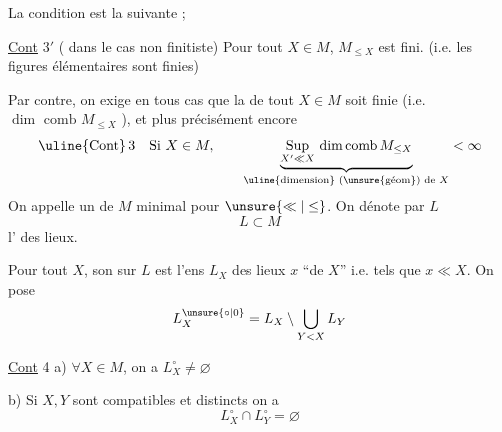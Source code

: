  La condition est la suivante ; 

\uline{Cont} $3'$ ( dans le cas non finitiste) \deleted{$\forall$} Pour tout $X\in M$,   $M_{\leq X}$ est fini. (i.e. les figures élémentaires sont finies)

Par contre, on exige en tous cas que la  de tout  $X\in M$ soit finie (i.e. $\dim\text{ comb }M_{\leq X}$ ), et plus  précisément encore
\[
\uline{\text{Cont}}\,3 \quad \text{Si } X\in M,\qquad
\underbrace{\mathop{\mathrm{Sup}}\limits_{X'\ll X}\,\mathrm{dim\,comb}\,M_{\leq X}}_{\text{\uline{dimension} (\unsure{géom}) de }X}<\infty
\]
On appelle  un  de $M$ minimal pour $\unsure{\ll|\leq}$. On dénote par $L$
\[
L\subset M
\]
l' des lieux.

Pour tout $X$, son   sur $L$ est l'ens $L_{X}$ des lieux $x$  ``de $X$'' i.e. tels que $x\ll X$. On pose
\[
L_X^{\unsure{\circ|0}}=L_X\setminus\bigcup_{Y<X}L_Y
\]

\uline{Cont} 4 \quad a) $\forall X\in M$, on a $L_X^{\circ}\neq\varnothing$

b) Si $X,Y$ sont compatibles et distincts on a
\[
L_X^{\circ}\cap L_Y^{\circ}=\varnothing
\]

